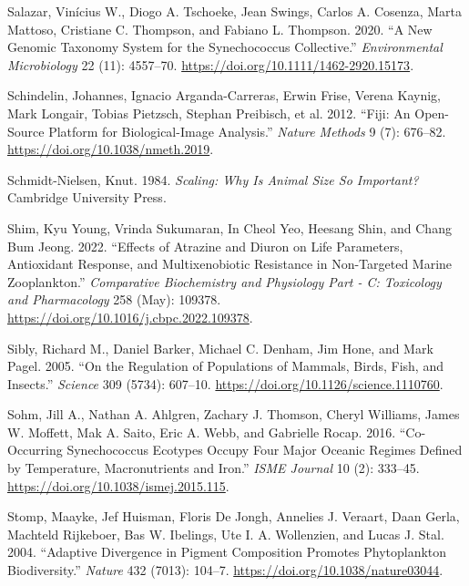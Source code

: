 \documentclass[
  letterpaper,
  DIV=11,
  numbers=noendperiod]{scrartcl}
\newlength{\cslhangindent}
\newenvironment{CSLReferences}[2] %
 {\begin{list}{}{%
  \setlength{\itemindent}{0pt}
  \setlength{\leftmargin}{0pt}
  \setlength{\parsep}{0pt}
  \ifodd #1
   \setlength{\leftmargin}{\cslhangindent}
   \setlength{\itemindent}{-1\cslhangindent}
  \fi
  \setlength{\itemsep}{#2\baselineskip}}}
 {\end{list}}
\begin{document}
\begin{CSLReferences}{1}{0}
Salazar, Vinícius W., Diogo A. Tschoeke, Jean Swings, Carlos A. Cosenza,
Marta Mattoso, Cristiane C. Thompson, and Fabiano L. Thompson. 2020.
{``A New Genomic Taxonomy System for the {Synechococcus} Collective.''}
\emph{Environmental Microbiology} 22 (11): 4557--70.
\url{https://doi.org/10.1111/1462-2920.15173}.

Schindelin, Johannes, Ignacio Arganda-Carreras, Erwin Frise, Verena
Kaynig, Mark Longair, Tobias Pietzsch, Stephan Preibisch, et al. 2012.
{``Fiji: {An} Open-Source Platform for Biological-Image Analysis.''}
\emph{Nature Methods} 9 (7): 676--82.
\url{https://doi.org/10.1038/nmeth.2019}.

Schmidt-Nielsen, Knut. 1984. \emph{Scaling: {Why} Is {Animal Size So
Important}?} {Cambridge University Press}.

Shim, Kyu Young, Vrinda Sukumaran, In Cheol Yeo, Heesang Shin, and Chang
Bum Jeong. 2022. {``Effects of Atrazine and Diuron on Life Parameters,
Antioxidant Response, and Multixenobiotic Resistance in Non-Targeted
Marine Zooplankton.''} \emph{Comparative Biochemistry and Physiology
Part - C: Toxicology and Pharmacology} 258 (May): 109378.
\url{https://doi.org/10.1016/j.cbpc.2022.109378}.

Sibly, Richard M., Daniel Barker, Michael C. Denham, Jim Hone, and Mark
Pagel. 2005. {``On the {Regulation} of {Populations} of {Mammals},
{Birds}, {Fish}, and {Insects}.''} \emph{Science} 309 (5734): 607--10.
\url{https://doi.org/10.1126/science.1110760}.

Sohm, Jill A., Nathan A. Ahlgren, Zachary J. Thomson, Cheryl Williams,
James W. Moffett, Mak A. Saito, Eric A. Webb, and Gabrielle Rocap. 2016.
{``Co-Occurring {Synechococcus} Ecotypes Occupy Four Major Oceanic
Regimes Defined by Temperature, Macronutrients and Iron.''} \emph{ISME
Journal} 10 (2): 333--45. \url{https://doi.org/10.1038/ismej.2015.115}.

Stomp, Maayke, Jef Huisman, Floris De Jongh, Annelies J. Veraart, Daan
Gerla, Machteld Rijkeboer, Bas W. Ibelings, Ute I. A. Wollenzien, and
Lucas J. Stal. 2004. {``Adaptive Divergence in Pigment Composition
Promotes Phytoplankton Biodiversity.''} \emph{Nature} 432 (7013):
104--7. \url{https://doi.org/10.1038/nature03044}.


\end{CSLReferences}
\end{document}
